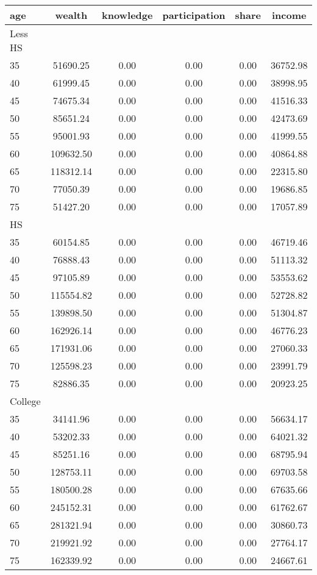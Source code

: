  \begin{tabular}{lccccc}
 \hline \hline
  age & wealth & knowledge & participation & share & income \\
 \hline
 Less HS & & & & & \\
 \hline
35 &  51690.25 &      0.00 &      0.00 &      0.00 &  36752.98 \\ 
40 &  61999.45 &      0.00 &      0.00 &      0.00 &  38998.95 \\ 
45 &  74675.34 &      0.00 &      0.00 &      0.00 &  41516.33 \\ 
50 &  85651.24 &      0.00 &      0.00 &      0.00 &  42473.69 \\ 
55 &  95001.93 &      0.00 &      0.00 &      0.00 &  41999.55 \\ 
60 & 109632.50 &      0.00 &      0.00 &      0.00 &  40864.88 \\ 
65 & 118312.14 &      0.00 &      0.00 &      0.00 &  22315.80 \\ 
70 &  77050.39 &      0.00 &      0.00 &      0.00 &  19686.85 \\ 
75 &  51427.20 &      0.00 &      0.00 &      0.00 &  17057.89 \\ 
 \hline
 HS & & & & & \\
 \hline
35 &  60154.85 &      0.00 &      0.00 &      0.00 &  46719.46 \\ 
40 &  76888.43 &      0.00 &      0.00 &      0.00 &  51113.32 \\ 
45 &  97105.89 &      0.00 &      0.00 &      0.00 &  53553.62 \\ 
50 & 115554.82 &      0.00 &      0.00 &      0.00 &  52728.82 \\ 
55 & 139898.50 &      0.00 &      0.00 &      0.00 &  51304.87 \\ 
60 & 162926.14 &      0.00 &      0.00 &      0.00 &  46776.23 \\ 
65 & 171931.06 &      0.00 &      0.00 &      0.00 &  27060.33 \\ 
70 & 125598.23 &      0.00 &      0.00 &      0.00 &  23991.79 \\ 
75 &  82886.35 &      0.00 &      0.00 &      0.00 &  20923.25 \\ 
 \hline
 College & & & & & \\
 \hline
35 &  34141.96 &      0.00 &      0.00 &      0.00 &  56634.17 \\ 
40 &  53202.33 &      0.00 &      0.00 &      0.00 &  64021.32 \\ 
45 &  85251.16 &      0.00 &      0.00 &      0.00 &  68795.94 \\ 
50 & 128753.11 &      0.00 &      0.00 &      0.00 &  69703.58 \\ 
55 & 180500.28 &      0.00 &      0.00 &      0.00 &  67635.66 \\ 
60 & 245152.31 &      0.00 &      0.00 &      0.00 &  61762.67 \\ 
65 & 281321.94 &      0.00 &      0.00 &      0.00 &  30860.73 \\ 
70 & 219921.92 &      0.00 &      0.00 &      0.00 &  27764.17 \\ 
75 & 162339.92 &      0.00 &      0.00 &      0.00 &  24667.61 \\ 
 \hline \hline
 \end{tabular}
